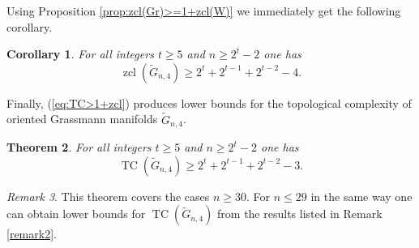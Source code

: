 \documentclass{amsart}
\newtheorem{theorem}{Theorem}[section]
\newtheorem{corollary}[theorem]{Corollary}
\theoremstyle{definition}
\theoremstyle{remark}
\newtheorem{remark}[theorem]{Remark}
\numberwithin{equation}{section}
\newcommand{\gr}{\widetilde G}
\newcommand{\zcl}{\operatorname{zcl}}
\newcommand{\tc}{\operatorname{TC}}
\renewcommand{\le}{\leqslant}
\renewcommand{\ge}{\geqslant}
\begin{document}
Using Proposition \ref{prop:zcl(Gr)>=1+zcl(W)} we immediately get the following corollary.

\begin{corollary}\label{prop:finale}
    For all integers $t\ge5$ and $n\ge2^t-2$ one has 
    \[\zcl(\gr_{n,4})\ge2^t+2^{t-1}+2^{t-2}-4.\]
\end{corollary}

Finally, (\ref{eq:TC>1+zcl}) produces lower bounds for the topological complexity of oriented Grassmann manifolds $\gr_{n,4}$.
\begin{theorem} For all integers $t\ge5$ and $n\ge2^t-2$ one has 
    \[\tc(\gr_{n,4})\ge2^t+2^{t-1}+2^{t-2}-3.\]
\end{theorem}

\begin{remark}
    This theorem covers the cases $n\ge30$. For $n\le29$ in the same way one can obtain lower bounds for $\tc(\gr_{n,4})$ from the results listed in Remark \ref{remark2}.
\end{remark}
\end{document}
